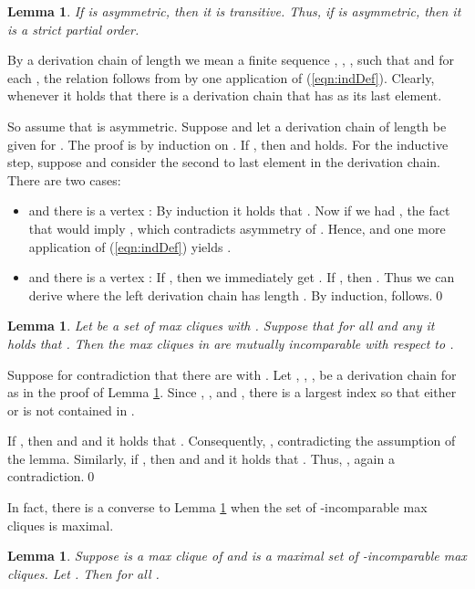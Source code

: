 \documentclass[10pt]{article}
\newtheorem{lem}[thm]{Lemma}
\theoremstyle{remark}
\theoremstyle{definition}
\theoremstyle{plain}
\begin{document}
\begin{lem} \label{lem:antisymImpTransitive}
If  is asymmetric, then it is transitive. Thus, if  is asymmetric, then it is a strict partial order.
\end{lem}

\proof By a derivation chain of length  we mean a finite sequence , , ,  such that  and for each , the relation  follows from  by one application of (\ref{eqn:indDef}). Clearly, whenever it holds that  there is a derivation chain that has  as its last element.

So assume that  is asymmetric. Suppose  and let a derivation chain  of length  be given for . The proof is by induction on . If , then  and  holds. For the inductive step, suppose  and consider the second to last element  in the derivation chain. There are two cases:
\begin{itemize}
\item  and there is a vertex : By induction it holds that . Now if we had , the fact that  would imply , which contradicts asymmetry of . Hence,  and one more application of (\ref{eqn:indDef}) yields .
\item  and there is a vertex : If , then we immediately get . If , then . Thus we can derive  where the left derivation chain has length . By induction,  follows.\qed
\end{itemize}


\begin{lem}\label{lem:moduleImpIncomparable}
Let  be a set of max cliques with . Suppose that for all  and any  it holds that . Then the max cliques in  are mutually incomparable with respect to .
\end{lem}

\proof Suppose for contradiction that there are  with . Let , , ,  be a derivation chain for  as in the proof of Lemma \ref{lem:antisymImpTransitive}. Since , , and , there is a largest index  so that either  or  is not contained in .

If , then  and  and it holds that . Consequently, , contradicting the assumption of the lemma. Similarly, if , then  and  and it holds that . Thus, , again a contradiction.\qed


In fact, there is a converse to Lemma \ref{lem:moduleImpIncomparable} when the set of -incomparable max cliques is maximal.



\begin{lem} \label{lem:sameIntersection}
Suppose  is a max clique of  and  is a maximal set of -incomparable max cliques. Let . Then  for all .
\end{lem}
\end{document}
